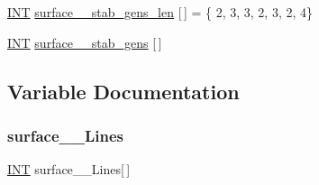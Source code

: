 \begin{DoxyCompactItemize}
\item 
\mbox{\hyperlink{galois_8h_a09fddde158a3a20bd2dcadb609de11dc}{I\+NT}} \mbox{\hyperlink{surface__17_8_c_a52cb7e4e21eb9f48f3085e017c258bfc}{surface\+\_\+\_\+stab\+\_\+gens\+\_\+len}} \mbox{[}$\,$\mbox{]} = \{ 2, 3, 3, 2, 3, 2, 4\}
\item 
\mbox{\hyperlink{galois_8h_a09fddde158a3a20bd2dcadb609de11dc}{I\+NT}} \mbox{\hyperlink{surface__17_8_c_a31fc6b1012228f586151dfdbf93aa4e3}{surface\+\_\+\_\+stab\+\_\+gens}} \mbox{[}$\,$\mbox{]}
\end{DoxyCompactItemize}


\subsection{Variable Documentation}
\mbox{\label{surface__17_8_c_aa4b0d9f184ca1be08d0211a000e4ce91}} 
\subsubsection{\texorpdfstring{surface\+\_\+\_\+\+Lines}{surface\_17\_Lines}}
{\footnotesize\ttfamily \mbox{\hyperlink{galois_8h_a09fddde158a3a20bd2dcadb609de11dc}{I\+NT}} surface\+\_\+\_\+\+Lines\mbox{[}$\,$\mbox{]}}

